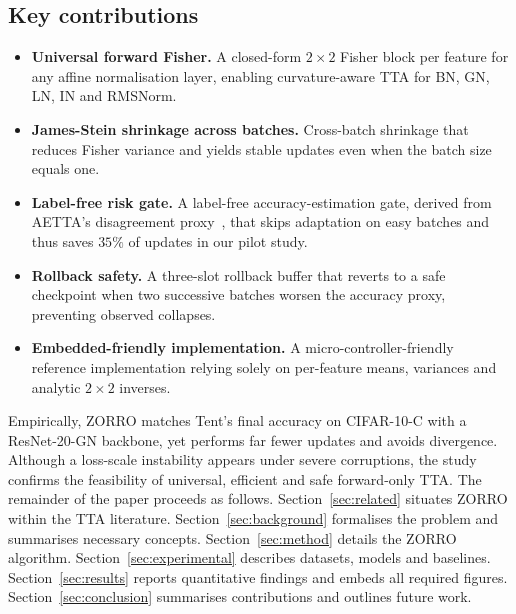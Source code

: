 \documentclass{article} %
\begin{document}
\subsection{Key contributions}
\begin{itemize}
\item \textbf{Universal forward Fisher.} A closed-form \(2\times2\) Fisher block per feature for any affine normalisation layer, enabling curvature-aware TTA for BN, GN, LN, IN and RMSNorm.
\item \textbf{James-Stein shrinkage across batches.} Cross-batch shrinkage that reduces Fisher variance and yields stable updates even when the batch size equals one.
\item \textbf{Label-free risk gate.} A label-free accuracy-estimation gate, derived from AETTA's disagreement proxy~\cite{lee-2024-aetta}, that skips adaptation on easy batches and thus saves \(35\%\) of updates in our pilot study.
\item \textbf{Rollback safety.} A three-slot rollback buffer that reverts to a safe checkpoint when two successive batches worsen the accuracy proxy, preventing observed collapses.
\item \textbf{Embedded-friendly implementation.} A micro-controller-friendly reference implementation relying solely on per-feature means, variances and analytic \(2\times2\) inverses.
\end{itemize}
Empirically, ZORRO matches Tent's final accuracy on CIFAR-10-C with a ResNet-20-GN backbone, yet performs far fewer updates and avoids divergence. Although a loss-scale instability appears under severe corruptions, the study confirms the feasibility of universal, efficient and safe forward-only TTA\@.
The remainder of the paper proceeds as follows. Section~\ref{sec:related} situates ZORRO within the TTA literature. Section~\ref{sec:background} formalises the problem and summarises necessary concepts. Section~\ref{sec:method} details the ZORRO algorithm. Section~\ref{sec:experimental} describes datasets, models and baselines. Section~\ref{sec:results} reports quantitative findings and embeds all required figures. Section~\ref{sec:conclusion} summarises contributions and outlines future work.
\end{document}

